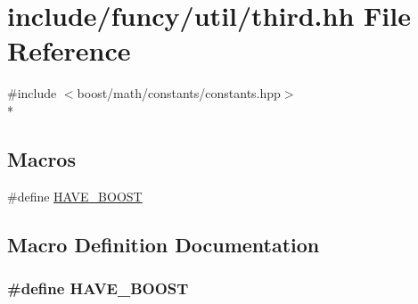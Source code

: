 \hypertarget{third_8hh}{\section{include/funcy/util/third.hh File Reference}
\label{third_8hh}
}
{\ttfamily \#include $<$boost/math/constants/constants.\-hpp$>$}\\*
\subsection*{Macros}
\begin{DoxyCompactItemize}
\item 
\#define \hyperlink{third_8hh_a1644f282a4f84575a270f96b98d4f3c6}{H\-A\-V\-E\-\_\-\-B\-O\-O\-S\-T}
\end{DoxyCompactItemize}


\subsection{Macro Definition Documentation}
\hypertarget{third_8hh_a1644f282a4f84575a270f96b98d4f3c6}{
\subsubsection[{H\-A\-V\-E\-\_\-\-B\-O\-O\-S\-T}]{\setlength{\rightskip}{0pt plus 5cm}\#define H\-A\-V\-E\-\_\-\-B\-O\-O\-S\-T}}\label{third_8hh_a1644f282a4f84575a270f96b98d4f3c6}

